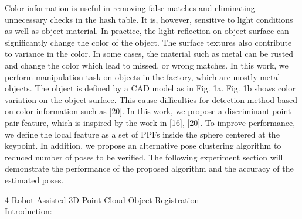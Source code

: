 \documentclass[10]{article}
\begin{document}
Color information is useful in removing false matches and eliminating unnecessary checks in the hash table. It is, however, sensitive to light conditions as well as object material. In practice, the light reflection on object surface can significantly change the color of the object. The surface textures also contribute to variance in the color. In some cases, the material such as metal can be rusted and change the color which lead to missed, or wrong matches. In this work, we perform manipulation task on objects in the factory, which are mostly metal objects. The object is defined by a CAD model as in Fig. 1a. Fig. 1b shows color variation on the object surface. This cause difficulties for detection method based on color information such as [20]. In this work, we propose a discriminant point-pair feature, which is inspired by the work in [16], [20]. To improve performance, we define the local feature as a set of PPFs inside the sphere centered at the keypoint. In addition, we propose an alternative pose clustering algorithm to reduced number of poses to be verified. The following experiment section will demonstrate the performance of the proposed algorithm and the accuracy of the estimated poses.


4
Robot  Assisted 3D Point Cloud Object Registration\\
Introduction:\\
\end{document}
